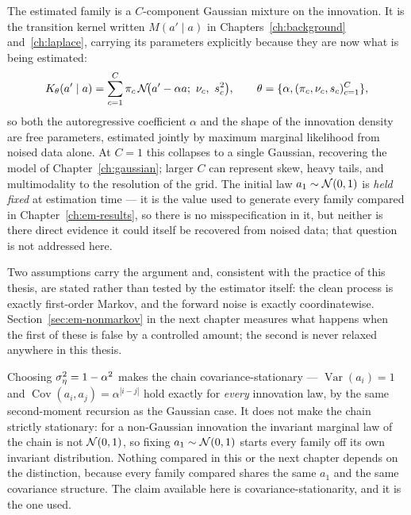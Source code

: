 The estimated family is a $C$-component Gaussian mixture on the innovation.
It is the transition kernel written $M(a' \mid a)$ in
Chapters~\ref{ch:background} and~\ref{ch:laplace}, carrying its parameters
explicitly because they are now what is being estimated:
\begin{equation}
  K_\theta(a' \mid a) = \sum_{c=1}^{C} \pi_c \,
    \mathcal{N}\!\big(a' - \alpha a;\ \nu_c,\ s_c^2\big),
  \qquad \theta = \{\alpha, (\pi_c,\nu_c,s_c)_{c=1}^C\},
  \label{eq:em-mixture-kernel}
\end{equation}
so both the autoregressive coefficient $\alpha$ and the shape of the
innovation density are free parameters, estimated jointly by maximum marginal
likelihood from noised data alone. At $C=1$ this collapses to a single
Gaussian, recovering the model of Chapter~\ref{ch:gaussian}; larger $C$ can
represent skew, heavy tails, and multimodality to the resolution of the
grid. The initial law $a_1 \sim \mathcal{N}(0,1)$ is \emph{held fixed} at
estimation time --- it is the value used to generate every family compared in
Chapter~\ref{ch:em-results}, so there is no misspecification in it, but
neither is there direct evidence it could itself be recovered from noised
data; that question is not addressed here.

Two assumptions carry the argument and, consistent with the practice of this
thesis, are stated rather than tested by the estimator itself: the clean
process is exactly first-order Markov, and the forward noise is exactly
coordinatewise. Section~\ref{sec:em-nonmarkov} in the next chapter measures
what happens when the first of these is false by a controlled amount; the
second is never relaxed anywhere in this thesis.

\begin{remark}
Choosing $\sigma_\eta^2=1-\alpha^2$ makes the chain covariance-stationary --- $\operatorname{Var}(a_i)=1$
and $\operatorname{Cov}(a_i,a_j)=\alpha^{|i-j|}$ hold exactly for \emph{every} innovation
law, by the same second-moment recursion as the Gaussian case. It does not
make the chain strictly stationary: for a non-Gaussian innovation the
invariant marginal law of the chain is not $\mathcal{N}(0,1)$, so fixing $a_1\sim
\mathcal{N}(0,1)$ starts every family off its own invariant distribution. Nothing
compared in this or the next chapter depends on the distinction, because every
family compared shares the same $a_1$ and the same covariance structure. The
claim available here is covariance-stationarity, and it is the one used.
\end{remark}

